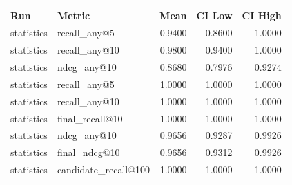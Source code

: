 \begin{tabular}{llrrr}
\toprule
Run & Metric & Mean & CI Low & CI High \\
\midrule
statistics & recall\_any@5 & 0.9400 & 0.8600 & 1.0000 \\
statistics & recall\_any@10 & 0.9800 & 0.9400 & 1.0000 \\
statistics & ndcg\_any@10 & 0.8680 & 0.7976 & 0.9274 \\
statistics & recall\_any@5 & 1.0000 & 1.0000 & 1.0000 \\
statistics & recall\_any@10 & 1.0000 & 1.0000 & 1.0000 \\
statistics & final\_recall@10 & 1.0000 & 1.0000 & 1.0000 \\
statistics & ndcg\_any@10 & 0.9656 & 0.9287 & 0.9926 \\
statistics & final\_ndcg@10 & 0.9656 & 0.9312 & 0.9926 \\
statistics & candidate\_recall@100 & 1.0000 & 1.0000 & 1.0000 \\
\bottomrule
\end{tabular}
